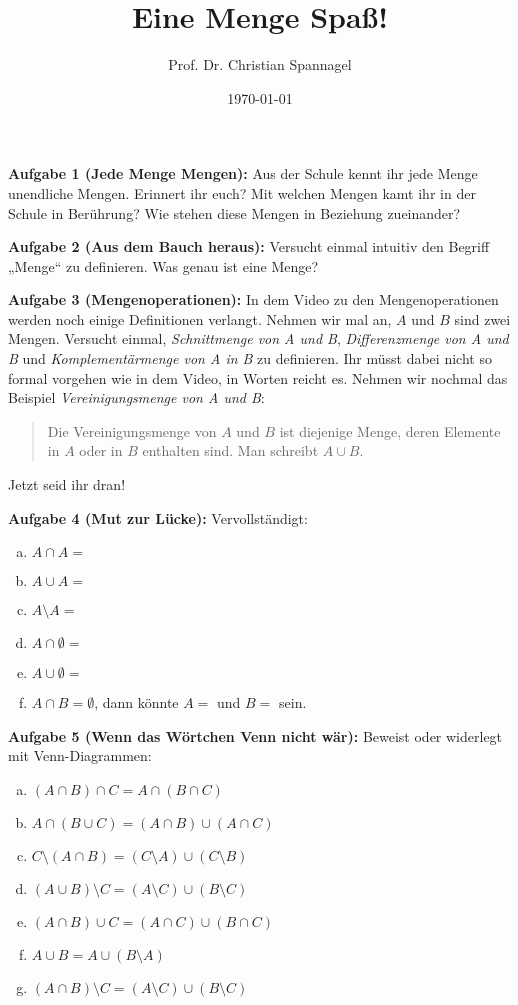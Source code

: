 \documentclass{../cssheet}
\title{Eine Menge Spaß!}
\author{Prof. Dr. Christian Spannagel}
\date{\today}
\begin{document}
\printtitle

\vspace*{10mm}

\textbf{Aufgabe 1 (Jede Menge Mengen):}  Aus der Schule kennt ihr jede Menge unendliche
Mengen. Erinnert ihr euch? Mit welchen Mengen kamt ihr in der Schule in Berührung? Wie
stehen diese Mengen in Beziehung zueinander?

\textbf{Aufgabe 2 (Aus dem Bauch heraus):} Versucht einmal intuitiv den Begriff „Menge“ zu
definieren. Was genau ist eine Menge?

\textbf{Aufgabe 3 (Mengenoperationen):}  In dem Video zu den Mengenoperationen werden noch
einige Definitionen verlangt. Nehmen wir mal an, $A$ und $B$ sind zwei Mengen. Versucht
einmal, \emph{Schnittmenge von A und B}, \emph{Differenzmenge von A und B} und
\emph{Komplementärmenge von A in B} zu definieren. Ihr müsst dabei nicht so formal vorgehen
wie in dem Video, in Worten reicht es. Nehmen wir nochmal das Beispiel
\emph{Vereinigungsmenge von A und B}:

\begin{quote}
Die Vereinigungsmenge von $A$ und $B$ ist diejenige Menge, deren Elemente in $A$ oder in $B$ enthalten sind. Man schreibt $A \cup B$.
\end{quote}

Jetzt seid ihr dran!
 
\textbf{Aufgabe 4 (Mut zur Lücke):}  
Vervollständigt:

\begin{enumerate}[a)]
\item $A \cap A = $
\item $A \cup A = $
\item $A\setminus A = $
\item $A\cap \emptyset =$
\item $A\cup \emptyset =$
\item $A\cap B = \emptyset$, dann könnte $A=$ \hspace{1cm} und $B=$ \hspace{1cm} sein.
\end{enumerate}

\textbf{Aufgabe 5 (Wenn das Wörtchen Venn nicht wär):}  
Beweist oder widerlegt mit Venn-Diagrammen:
\begin{enumerate}[a)]
\item $(A \cap B) \cap C = A \cap (B \cap C)$
\item $A \cap (B \cup C) = (A \cap B) \cup (A \cap  C)$
\item $C\setminus (A\cap B) = (C\setminus A) \cup (C\setminus B)$
\item $(A\cup B)\setminus C = (A\setminus C) \cup (B\setminus C)$
\item $(A\cap B)\cup C = (A\cap C) \cup (B\cap C)$
\item $A\cup B = A \cup (B\setminus A)$
\item $(A\cap B)\setminus C = (A\setminus C) \cup (B\setminus C)$
\end{enumerate}
\end{document}
